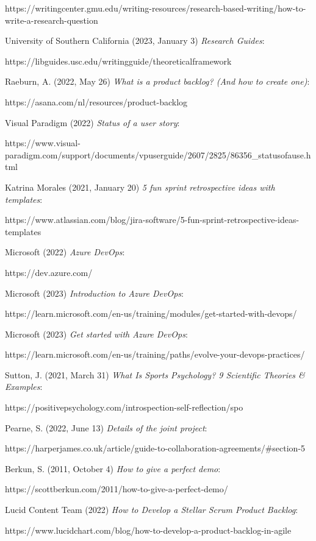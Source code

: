 \documentclass[10pt]{report}
\begin{document}
\begin{thebibliography}{1}
https://writingcenter.gmu.edu/writing-resources/research-based-writing/how-to-write-a-research-question

University of Southern California (2023, January 3) \emph{Research Guides}:

https://libguides.usc.edu/writingguide/theoreticalframework

 Raeburn, A. (2022, May 26) \emph{What is a product backlog? (And how to create one)}:

https://asana.com/nl/resources/product-backlog

Visual Paradigm (2022) \emph{Status of a user story}:

https://www.visual-paradigm.com/support/documents/vpuserguide/2607/2825/86356\_statusofause.html

Katrina Morales (2021, January 20) \emph{5 fun sprint retrospective ideas with templates}:

https://www.atlassian.com/blog/jira-software/5-fun-sprint-retrospective-ideas-templates

Microsoft (2022) \emph{Azure DevOps}:

https://dev.azure.com/

Microsoft (2023) \emph{Introduction to Azure DevOps}:

https://learn.microsoft.com/en-us/training/modules/get-started-with-devops/

Microsoft (2023) \emph{Get started with Azure DevOps}:

https://learn.microsoft.com/en-us/training/paths/evolve-your-devops-practices/	

Sutton, J. (2021, March 31) \emph{What Is Sports Psychology? 9 Scientific Theories \& Examples}:

https://positivepsychology.com/introspection-self-reflection/spo

Pearne, S. (2022, June 13) \emph{Details of the joint project}:

https://harperjames.co.uk/article/guide-to-collaboration-agreements/\#section-5

Berkun, S. (2011, October 4) \emph{How to give a perfect demo}:

https://scottberkun.com/2011/how-to-give-a-perfect-demo/

Lucid Content Team (2022) \emph{How to Develop a Stellar Scrum Product Backlog}:

https://www.lucidchart.com/blog/how-to-develop-a-product-backlog-in-agile

\end{thebibliography}

\newpage
\end{document}
